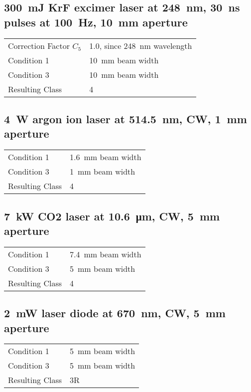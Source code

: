 \documentclass[a4paper]{scrartcl}
\begin{document}
\subsection{\SI{300}{\milli\joule} KrF excimer laser at \SI{248}{\nano\metre}, \SI{30}{\nano\second} pulses at \SI{100}{\hertz}, \SI{10}{\milli\metre} aperture}
\begin{tabular}{l | l}
    Correction Factor \(C_5\) & 1.0, since \SI{248}{\nano\metre} wavelength \\
    Condition 1 & \SI{10}{\milli\metre} beam width \\
    Condition 3 & \SI{10}{\milli\metre} beam width \\
    Resulting Class & 4
\end{tabular}

\subsection{\SI{4}{\watt} argon ion laser at \SI{514.5}{\nano\metre}, CW, \SI{1}{\milli\metre} aperture}
\begin{tabular}{l | l}
    Condition 1 & \SI{1.6}{\milli\metre} beam width \\
    Condition 3 & \SI{1}{\milli\metre} beam width \\
    Resulting Class & 4
\end{tabular}

\subsection{\SI{7}{\kilo\watt} CO2 laser at \SI{10.6}{\micro\metre}, CW, \SI{5}{\milli\metre} aperture}
\begin{tabular}{l | l}
    Condition 1 & \SI{7.4}{\milli\metre} beam width \\
    Condition 3 & \SI{5}{\milli\metre} beam width \\
    Resulting Class & 4
\end{tabular}

\subsection{\SI{2}{\milli\watt} laser diode at \SI{670}{\nano\metre}, CW, \SI{5}{\milli\metre} aperture}
\begin{tabular}{l | l}
    Condition 1 & \SI{5}{\milli\metre} beam width \\
    Condition 3 & \SI{5}{\milli\metre} beam width \\
    Resulting Class & 3R
\end{tabular}
\end{document}
